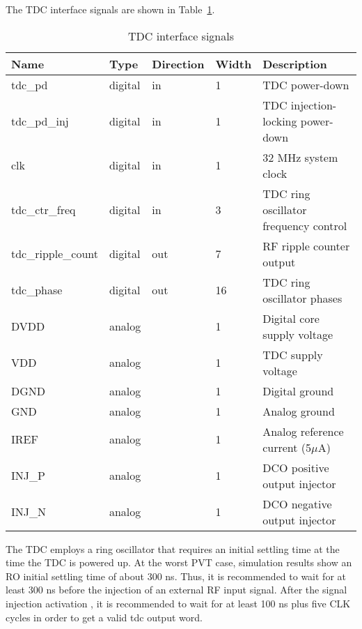 The TDC interface signals are shown in Table~\ref{tab:tdc_interface}. 
\begin{table}[!h]
  \centering
    \begin{tabular}{|p{3cm}|p{1.5cm}|p{2cm}|p{1.5cm}|p{7cm}|}
      \hline
      \rowcolor{tab-green}
    {\bf Name} & {\bf Type} & {\bf Direction} & {\bf Width} & {\bf Description} \\
    \hline \hline   
    tdc\_pd & digital & in  & 1 & TDC power-down\\
    \hline
    tdc\_pd\_inj & digital & in  & 1 & TDC injection-locking power-down\\
    \hline
    clk &  digital & in & 1 & 32 MHz system clock \\
    \hline
    tdc\_ctr\_freq & digital & in  & 3 & TDC ring oscillator frequency control\\
    \hline
    tdc\_ripple\_count & digital & out  & 7 & RF ripple counter output\\
    \hline
    tdc\_phase & digital & out  & 16 & TDC ring oscillator phases\\
    \hline
    DVDD & analog &  & 1 & Digital core supply voltage \\
    \hline
    VDD & analog &   & 1 & TDC supply voltage \\
    \hline
    DGND & analog &    & 1 & Digital ground \\
    \hline
    GND & analog &    & 1 & Analog ground \\
    \hline
    IREF & analog &    & 1 & Analog reference current (5$\mu$A) \\
    \hline
    INJ\_P & analog &    & 1 & DCO positive output injector\\
    \hline
    INJ\_N & analog &    & 1 & DCO negative output injector \\
    \hline
  
    \end{tabular}
  \caption{TDC interface signals}
  \label{tab:tdc_interface}
\end{table}

The TDC employs a ring oscillator that requires an initial settling time at the time the TDC is powered up. At the worst PVT case, simulation results show an RO initial settling time of about 300 ns. Thus, it is recommended to wait for at least 300 ns before the injection of an external RF input signal. After the signal injection activation , it is recommended to wait for at least 100 ns plus five CLK cycles in order to get a valid tdc output word.



